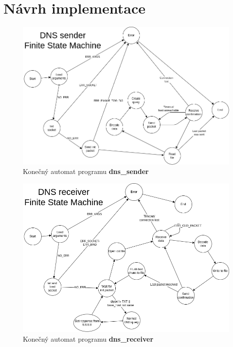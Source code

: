 \documentclass[a4paper,11pt]{article}
\begin{document}
    \section{Návrh implementace}
    \begin{figure}[h!]
        \centering
        \includegraphics[width=400pt]{sender_fsm}
        \caption{Konečný automat programu \textbf{dns\_sender}}
    \end{figure}
    \begin{figure}[h]
        \centering
        \includegraphics[width=400pt]{receiver_fsm}
        \caption{Konečný automat programu \textbf{dns\_receiver}}
    \end{figure}
\end{document}
